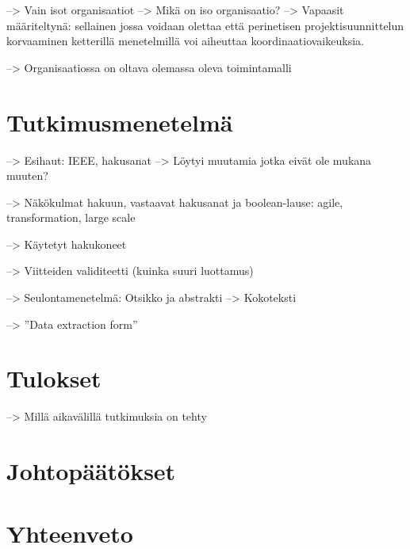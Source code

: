 --> Vain isot organisaatiot
--> Mikä on iso organisaatio? --> Vapaasit määriteltynä: sellainen jossa voidaan
olettaa että perinetisen projektisuunnittelun korvaaminen ketterillä
menetelmillä voi aiheuttaa koordinaatiovaikeuksia.

--> Organisaatiossa on oltava olemassa oleva toimintamalli


\section{Tutkimusmenetelmä}
\label{sec:menetelma}

\citep{refworks:148}

--> Esihaut: IEEE, hakusanat --> Löytyi muutamia jotka eivät ole mukana muuten?

--> Näkökulmat hakuun, vastaavat hakusanat ja boolean-lause: agile,
transformation, large scale

--> Käytetyt hakukoneet

--> Viitteiden validiteetti (kuinka suuri luottamus)

--> Seulontamenetelmä: Otsikko ja abstrakti --> Kokoteksti

--> ''Data extraction form''


\section{Tulokset}
\label{sec:tulokset}

--> Millä aikavälillä tutkimuksia on tehty


\section{Johtopäätökset}
\label{sec:johtopaatokset}





\section{Yhteenveto}
\label{sec:yhteenveto}




